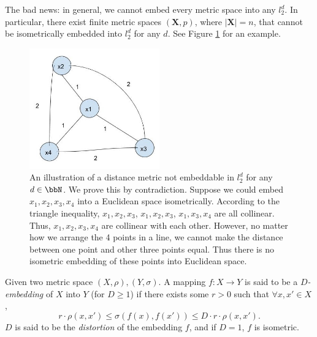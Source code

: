 The bad news: in general, we cannot embed every metric space into any $l_2^d$.
In particular, there exist finite metric spaces
$(\mathbf{X},p)$, where $|\mathbf{X}| = n$, that
cannot be isometrically embedded into $l_2^d$ for any $d$.
See Figure \ref{fig:unembeddable} for an example. 

\begin{figure}[h!]
\begin{center}
\includegraphics[width=0.5\textwidth]{chapter_5/files/unembeddable.jpg}
\caption{An illustration of a distance metric not embeddable in $l_2^d$ for any $d \in \bbN$.
We prove this by contradiction. Suppose we could embed $x_1, x_2, x_3, x_4$ into a Euclidean space isometrically.
According to the triangle inequality, $x_1 ,x_2, x_3$, $x_1, x_2, x_3$, $x_1, x_3, x_4$ are all collinear.
Thus, $x_1, x_2, x_3, x_4$ are collinear with each other.
However, no matter how we arrange the 4 points in a line,
we cannot make the distance between one point and other three points equal.
Thus there is no isometric embedding of these points into Euclidean space.}
\label{fig:unembeddable}
\end{center}
\end{figure}

\begin{definition}
Given two metric space $(X,\rho), (Y,\sigma)$. A mapping $f:
X\rightarrow Y$ is said to be a \emph{$D$-embedding} of $X$ into $Y$
(for $D\geq 1$) if there exists some $r>0$ such that $\forall x,x'
\in X$, 
\[
r \cdot \rho(x,x') \leq \sigma(f(x),f(x')) \leq D \cdot r \cdot
\rho(x,x').
\]
$D$ is said to be the \emph{distortion} of the embedding $f$, and if $D=1$, $f$ is isometric.
\end{definition}
